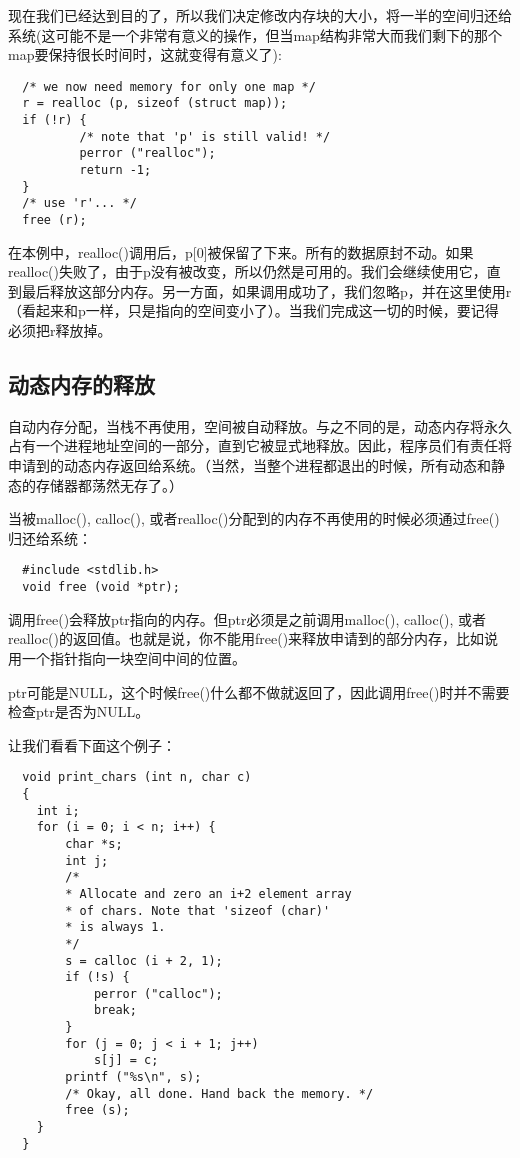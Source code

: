 现在我们已经达到目的了，所以我们决定修改内存块的大小，将一半的空间归还给系统(这可能不是一个非常有意义的操作，但当map结构非常大而我们剩下的那个map要保持很长时间时，这就变得有意义了):

\begin{lstlisting}
  /* we now need memory for only one map */
  r = realloc (p, sizeof (struct map));
  if (!r) {
          /* note that 'p' is still valid! */
          perror ("realloc");
          return -1;
  }
  /* use 'r'... */
  free (r);
\end{lstlisting}

在本例中，realloc()调用后，p[0]被保留了下来。所有的数据原封不动。如果realloc()失败了，由于p没有被改变，所以仍然是可用的。我们会继续使用它，直到最后释放这部分内存。另一方面，如果调用成功了，我们忽略p，并在这里使用r（看起来和p一样，只是指向的空间变小了）。当我们完成这一切的时候，要记得必须把r释放掉。 

\subsection{动态内存的释放}

自动内存分配，当栈不再使用，空间被自动释放。与之不同的是，动态内存将永久占有一个进程地址空间的一部分，直到它被显式地释放。因此，程序员们有责任将申请到的动态内存返回给系统。（当然，当整个进程都退出的时候，所有动态和静态的存储器都荡然无存了。）

当被malloc(), calloc(), 或者realloc()分配到的内存不再使用的时候必须通过free()归还给系统： 

\begin{lstlisting}
  #include <stdlib.h>
  void free (void *ptr);
\end{lstlisting}

调用free()会释放ptr指向的内存。但ptr必须是之前调用malloc(), calloc(), 或者realloc()的返回值。也就是说，你不能用free()来释放申请到的部分内存，比如说用一个指针指向一块空间中间的位置。

ptr可能是NULL，这个时候free()什么都不做就返回了，因此调用free()时并不需要检查ptr是否为NULL。

让我们看看下面这个例子： 

\begin{lstlisting}
  void print_chars (int n, char c)
  {
    int i;
    for (i = 0; i < n; i++) {
        char *s;
        int j;
        /*
        * Allocate and zero an i+2 element array
        * of chars. Note that 'sizeof (char)'
        * is always 1.
        */
        s = calloc (i + 2, 1);
        if (!s) {
            perror ("calloc");
            break;
        }
        for (j = 0; j < i + 1; j++)
            s[j] = c;
        printf ("%s\n", s);
        /* Okay, all done. Hand back the memory. */
        free (s);
    }
  }
\end{lstlisting}

